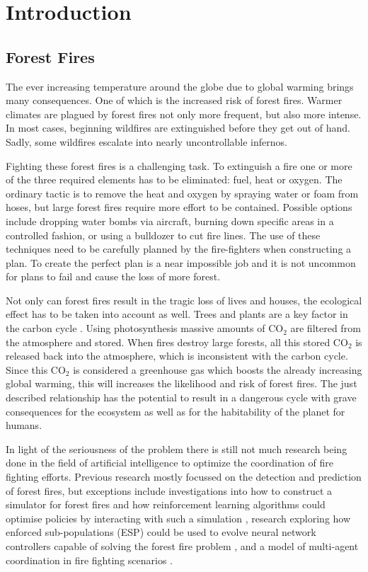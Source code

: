
\section{Introduction}\label{sec:introduction}

\subsection{Forest Fires}
The ever increasing temperature around the globe due to global warming brings many consequences. One of which is the increased risk of forest fires. Warmer climates are plagued by forest fires not only more frequent, but also more intense.  In most cases, beginning wildfires are extinguished before they get out of hand. Sadly, some wildfires escalate into nearly uncontrollable infernos.

Fighting these forest fires is a challenging task. To extinguish a fire one or more of the three required elements has to be eliminated: fuel, heat or oxygen. The ordinary tactic is to remove the heat and oxygen by spraying water or foam from hoses, but large forest fires require more effort to be contained. Possible options include dropping water bombs via aircraft, burning down specific areas in a controlled fashion, or using a bulldozer to cut fire lines. The use of these techniques need to be carefully planned by the fire-fighters when constructing a plan. To create the perfect plan is a near impossible job and it is not uncommon for plans to fail and cause the loss of more forest.

Not only can forest fires result in the tragic loss of lives and houses, the ecological effect has to be taken into account as well. Trees and plants are a key factor in the carbon cycle \citep{kasischke1995fire}. Using photosynthesis massive amounts of CO$_{2}$ are filtered from the atmosphere and stored. When fires destroy large forests, all this stored CO$_{2}$ is released back into the atmosphere, which is inconsistent with the carbon cycle. Since this CO$_{2}$ is considered a greenhouse gas \citep{houghton1991climate} which boosts the already increasing global warming, this will increases the likelihood and risk of forest fires. The just described relationship has the potential to result in a dangerous cycle with grave consequences for the ecosystem as well as for the habitability of the planet for humans.

In light of the seriousness of the problem there is still not much research being done in the field of artificial intelligence to optimize the coordination of fire fighting efforts. Previous research mostly focussed on the detection and prediction of forest fires, but exceptions include investigations into how to construct a simulator for forest fires and how reinforcement learning algorithms could optimise policies by interacting with such a simulation \citep{wiering1998learning}, research exploring how enforced sub-populations (ESP) could be used to evolve neural network controllers capable of solving the forest fire problem \citep{wiering2005evolving}, and a model of multi-agent coordination in fire fighting scenarios \citep{moura2007fighting}.

